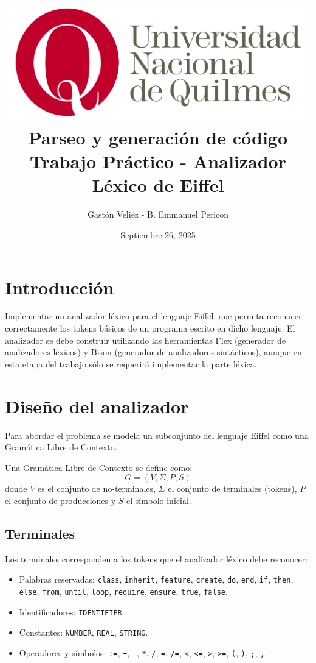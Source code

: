 \documentclass[a4paper,12pt]{article}
\title{
    \includegraphics[scale=1.3]{logo-UNQ}\\
    \vspace{4mm}
    \huge{Parseo y generación de código  \\
        \vspace{4mm}
        Trabajo Práctico - Analizador Léxico de Eiffel} }
\author{Gastón Veliez - B. Emmanuel Pericon}
\date{Septiembre 26, 2025}
\begin{document}
\maketitle

\tableofcontents

\newpage

\section{Introducción}

\vspace{4mm}
Implementar un analizador léxico para el lenguaje Eiffel, que permita reconocer
correctamente los tokens básicos de un programa escrito en dicho lenguaje.
El analizador se debe construir utilizando las herramientas Flex (generador de
analizadores
léxicos) y Bison (generador de analizadores sintácticos), aunque en esta etapa
del trabajo
sólo se requerirá implementar la parte léxica.

\vspace{6mm}
\section{Diseño del analizador}
\vspace{4mm}

Para abordar el problema se modela un subconjunto del lenguaje Eiffel como una Gramática Libre de Contexto. 

Una Gramática Libre de Contexto se define como:
\[
G = (V, \Sigma, P, S)
\]
donde $V$ es el conjunto de no-terminales, $\Sigma$ el conjunto de terminales (tokens), $P$ el conjunto de producciones y $S$ el símbolo inicial.

\subsection{Terminales}
Los terminales corresponden a los tokens que el analizador léxico debe reconocer:
\begin{itemize}
    \item Palabras reservadas: \texttt{class}, \texttt{inherit}, \texttt{feature}, \texttt{create}, \texttt{do}, \texttt{end}, \texttt{if}, \texttt{then}, \texttt{else}, \texttt{from}, \texttt{until}, \texttt{loop}, \texttt{require}, \texttt{ensure}, \texttt{true}, \texttt{false}.
    \item Identificadores: \texttt{IDENTIFIER}.
    \item Constantes: \texttt{NUMBER}, \texttt{REAL}, \texttt{STRING}.
    \item Operadores y símbolos: \texttt{:=}, \texttt{+}, \texttt{-}, \texttt{*}, \texttt{/}, \texttt{=}, \texttt{/=}, \texttt{<}, \texttt{<=}, \texttt{>}, \texttt{>=}, \texttt{(}, \texttt{)}, \texttt{;}, \texttt{,}.
\end{itemize}
\end{document}
